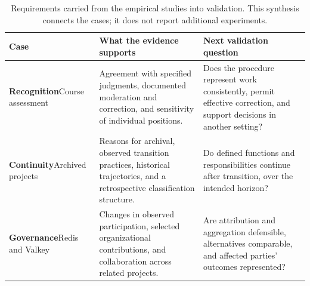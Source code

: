\begin{table}[htbp]
\caption{Requirements carried from the empirical studies into validation. This synthesis connects the cases; it does not report additional experiments.}
\label{tab:part3-validation}
\centering\small
\renewcommand{\arraystretch}{1.17}
\begin{tabularx}{\linewidth}{@{}>{\raggedright\arraybackslash}p{23mm}>{\raggedright\arraybackslash}X>{\raggedright\arraybackslash}X@{}}
\toprule
\textbf{Case} & \textbf{What the evidence supports} & \textbf{Next validation question}\\
\midrule
\textbf{Recognition}\newline Course assessment & Agreement with specified judgments, documented moderation and correction, and sensitivity of individual positions. & Does the procedure represent work consistently, permit effective correction, and support decisions in another setting?\\[5pt]
\textbf{Continuity}\newline Archived projects & Reasons for archival, observed transition practices, historical trajectories, and a retrospective classification structure. & Do defined functions and responsibilities continue after transition, over the intended horizon?\\[5pt]
\textbf{Governance}\newline Redis and Valkey & Changes in observed participation, selected organizational contributions, and collaboration across related projects. & Are attribution and aggregation defensible, alternatives comparable, and affected parties' outcomes represented?\\
\bottomrule
\end{tabularx}
\end{table}
